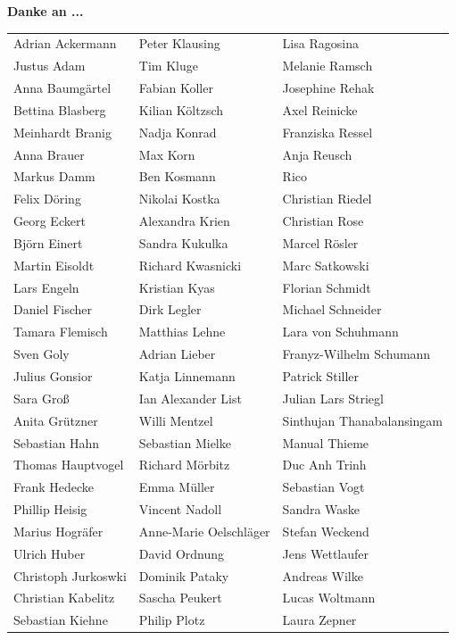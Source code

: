 \textbf{Danke an ...}
\\

\begin{tabular}{l l l} 

Adrian Ackermann  & Peter Klausing  & Lisa Ragosina\\
Justus Adam  & Tim Kluge & Melanie Ramsch\\
Anna Baumgärtel  & Fabian Koller & Josephine Rehak\\
Bettina  Blasberg & Kilian Költzsch & Axel Reinicke\\
Meinhardt Branig & Nadja Konrad & Franziska Ressel\\
Anna Brauer & Max Korn & Anja Reusch\\
Markus Damm & Ben Kosmann  & Rico\\
Felix Döring  & Nikolai Kostka & Christian Riedel\\
Georg Eckert & Alexandra Krien & Christian Rose\\
Björn Einert & Sandra Kukulka & Marcel Rösler\\
Martin Eisoldt & Richard Kwasnicki & Marc Satkowski\\
Lars Engeln  & Kristian Kyas & Florian Schmidt\\
Daniel Fischer & Dirk Legler & Michael Schneider\\
Tamara Flemisch & Matthias Lehne & Lara von Schuhmann\\
Sven Goly & Adrian Lieber & Franyz-Wilhelm Schumann\\
Julius Gonsior & Katja Linnemann & Patrick Stiller\\
Sara Groß & Ian Alexander List & Julian Lars Striegl\\
Anita Grützner & Willi Mentzel & Sinthujan Thanabalansingam\\
Sebastian Hahn & Sebastian Mielke & Manual Thieme\\
Thomas Hauptvogel & Richard Mörbitz & Duc Anh Trinh\\
Frank Hedecke & Emma Müller & Sebastian Vogt\\
Phillip Heisig & Vincent Nadoll & Sandra Waske\\
Marius Hogräfer & Anne-Marie Oelschläger & Stefan Weckend\\
Ulrich Huber & David Ordnung & Jens Wettlaufer\\
Christoph Jurkoswki & Dominik Pataky & Andreas Wilke\\
Christian Kabelitz & Sascha Peukert & Lucas Woltmann\\
Sebastian Kiehne & Philip Plotz & Laura Zepner\\

\end{tabular}

